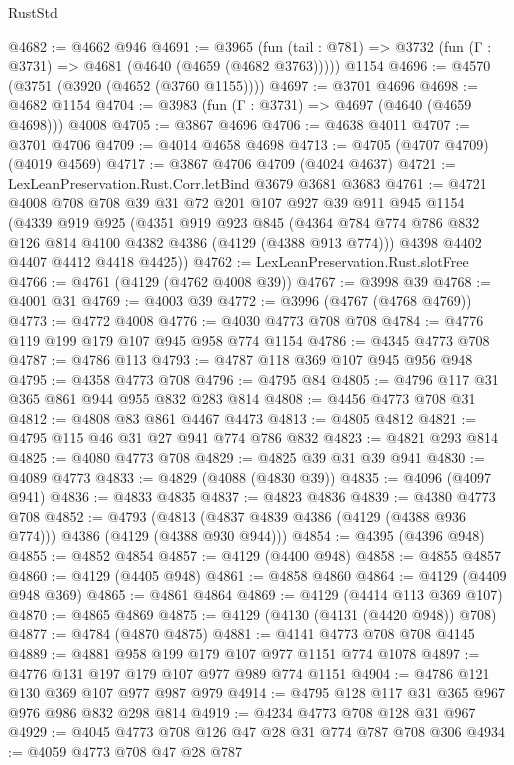 \begin{lexlean}{RustStd}
\begin{coremodule}
@4682 := @4662 @946
@4691 := @3965
    (fun (tail : @781) => @3732 (fun (Γ : @3731) => @4681 (@4640 (@4659 (@4682 @3763)))))
    @1154
@4696 := @4570 (@3751 (@3920 (@4652 (@3760 @1155))))
@4697 := @3701 @4696
@4698 := @4682 @1154
@4704 := @3983 (fun (Γ : @3731) => @4697 (@4640 (@4659 @4698))) @4008
@4705 := @3867 @4696
@4706 := @4638 @4011
@4707 := @3701 @4706
@4709 := @4014 @4658 @4698
@4713 := @4705 (@4707 @4709) (@4019 @4569)
@4717 := @3867 @4706 @4709 (@4024 @4637)
@4721 := LexLeanPreservation.Rust.Corr.letBind @3679 @3681 @3683
@4761 := @4721
    @4008
    @708
    @708
    @39
    @31
    @72
    @201
    @107
    @927
    @39
    @911
    @945
    @1154
    (@4339
      @919
      @925
      (@4351
        @919
        @923
        @845
        (@4364 @784 @774 @786 @832 @126 @814 @4100 @4382 @4386 (@4129 (@4388 @913 @774)))
        @4398
        @4402
        @4407
        @4412
        @4418
        @4425))
@4762 := LexLeanPreservation.Rust.slotFree
@4766 := @4761 (@4129 (@4762 @4008 @39))
@4767 := @3998 @39
@4768 := @4001 @31
@4769 := @4003 @39
@4772 := @3996 (@4767 (@4768 @4769))
@4773 := @4772 @4008
@4776 := @4030 @4773 @708 @708
@4784 := @4776 @119 @199 @179 @107 @945 @958 @774 @1154
@4786 := @4345 @4773 @708
@4787 := @4786 @113
@4793 := @4787 @118 @369 @107 @945 @956 @948
@4795 := @4358 @4773 @708
@4796 := @4795 @84
@4805 := @4796 @117 @31 @365 @861 @944 @955 @832 @283 @814
@4808 := @4456 @4773 @708 @31
@4812 := @4808 @83 @861 @4467 @4473
@4813 := @4805 @4812
@4821 := @4795 @115 @46 @31 @27 @941 @774 @786 @832
@4823 := @4821 @293 @814
@4825 := @4080 @4773 @708
@4829 := @4825 @39 @31 @39 @941
@4830 := @4089 @4773
@4833 := @4829 (@4088 (@4830 @39))
@4835 := @4096 (@4097 @941)
@4836 := @4833 @4835
@4837 := @4823 @4836
@4839 := @4380 @4773 @708
@4852 := @4793 (@4813 (@4837 @4839 @4386 (@4129 (@4388 @936 @774))) @4386 (@4129 (@4388 @930 @944)))
@4854 := @4395 (@4396 @948)
@4855 := @4852 @4854
@4857 := @4129 (@4400 @948)
@4858 := @4855 @4857
@4860 := @4129 (@4405 @948)
@4861 := @4858 @4860
@4864 := @4129 (@4409 @948 @369)
@4865 := @4861 @4864
@4869 := @4129 (@4414 @113 @369 @107)
@4870 := @4865 @4869
@4875 := @4129 (@4130 (@4131 (@4420 @948)) @708)
@4877 := @4784 (@4870 @4875)
@4881 := @4141 @4773 @708 @708 @4145
@4889 := @4881 @958 @199 @179 @107 @977 @1151 @774 @1078
@4897 := @4776 @131 @197 @179 @107 @977 @989 @774 @1151
@4904 := @4786 @121 @130 @369 @107 @977 @987 @979
@4914 := @4795 @128 @117 @31 @365 @967 @976 @986 @832 @298 @814
@4919 := @4234 @4773 @708 @128 @31 @967
@4929 := @4045 @4773 @708 @126 @47 @28 @31 @774 @787 @708 @306
@4934 := @4059 @4773 @708 @47 @28 @787

\end{coremodule}
\end{lexlean}
